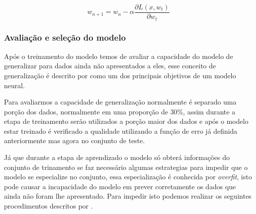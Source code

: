 \documentclass[
    12pt,
    oneside,
    a4paper,
    english,
    brazil
]{abntex2}
\begin{document}
\begin{equation}\label{eq:backpropagation}
    w_{n+1} = w_n - \alpha \frac{\partial L(x,w_t)}{\partial w_t}
\end{equation}

\subsubsection{Avaliação e seleção do modelo}

Após  o treinamento  do  modelo temos  de  avaliar a  capacidade  do modelo  de
generalizar  para  dados  ainda  não  apresentados a  eles,  esse  conceito  de
generalização  é descrito  por   como um  dos principais
objetivos de um modelo neural.

Para avaliarmos a capacidade de generalização normalmente é separado uma porção
dos  dados, normalmente  em uma  proporção de  30\%, assim  durante a  etapa de
treinamento serão  utilizados a porção  maior dos dados  e após o  modelo estar
treinado  é verificado  a qualidade  utilizando a  função de  erro já  definida
anteriormente mas agora no conjunto de teste.

Já  que  durante  a  etapa  de  aprendizado  o  modelo  só  obterá  informações
do  conjunto  de   trinamento  se  faz  necessário   algumas  estrategias  para
impedir  que  o  modelo  se  especialize no  conjunto,  essa  especialização  é
conhecida por  \textit{overfit}, isto pode  causar a incapacidade do  modelo em
prever  corretamente  os  dados  que  ainda não  foram  lhe  apresentado.  Para
impedir  isto  podemos  realizar   os  seguintes  procedimentos  descritos  por
.
\end{document}
